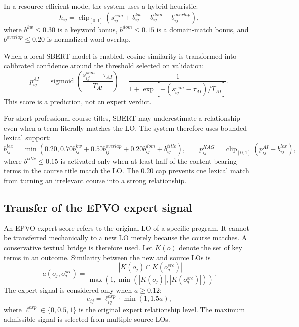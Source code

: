 \documentclass[twoside,11pt]{article}
\newcommand{\clip}{\operatorname{clip}}
\newcommand{\sigmoid}{\operatorname{sigmoid}}
\begin{document}
In a resource-efficient mode, the system uses a hybrid heuristic:
\begin{equation}
  h_{ij}=\clip_{[0,1]}
  \left(
    s_{ij}^{sem}
    +b_{ij}^{kw}
    +b_{ij}^{dom}
    +b_{ij}^{overlap}
  \right),
  \label{eq:heuristic}
\end{equation}
where $b^{kw}\le0.30$ is a keyword bonus, $b^{dom}\le0.15$ is a domain-match bonus, and $b^{overlap}\le0.20$ is normalized word overlap.

When a local SBERT model is enabled, cosine similarity is transformed into calibrated confidence around the threshold selected on validation:
\begin{equation}
  p_{ij}^{AI}=
  \sigmoid\left(
    \frac{s_{ij}^{sem}-\tau_{AI}}{T_{AI}}
  \right)
  =
  \frac{1}
       {1+\exp\left[-(s_{ij}^{sem}-\tau_{AI})/T_{AI}\right]}.
  \label{eq:calibration}
\end{equation}
This score is a prediction, not an expert verdict.

For short professional course titles, SBERT may underestimate a relationship even when a term literally matches the LO. The system therefore uses bounded lexical support:
\begin{equation}
  b_{ij}^{lex}=\min\!\left(0.20,
  0.70b_{ij}^{kw}+0.50b_{ij}^{overlap}+0.20b_{ij}^{dom}+b_{ij}^{title}\right),
  \qquad
  p_{ij}^{KAG}=\clip_{[0,1]}\left(p_{ij}^{AI}+b_{ij}^{lex}\right),
  \label{eq:ai-lexical-support}
\end{equation}
where $b^{title}\le0.15$ is activated only when at least half of the content-bearing terms in the course title match the LO. The 0.20 cap prevents one lexical match from turning an irrelevant course into a strong relationship.

\subsection{Transfer of the EPVO expert signal}

An EPVO expert score refers to the original LO of a specific program. It cannot be transferred mechanically to a new LO merely because the course matches. A conservative textual bridge is therefore used. Let $K(o)$ denote the set of key terms in an outcome. Similarity between the new and source LOs is
\begin{equation}
  a(o_j,o_q^{src})=
  \frac{|K(o_j)\cap K(o_q^{src})|}
       {\max\left(1,\min(|K(o_j)|,|K(o_q^{src})|)\right)}.
  \label{eq:expert-overlap}
\end{equation}
The expert signal is considered only when $a\ge0.12$:
\begin{equation}
  e_{ij}=
  \ell_{iq}^{exp}\cdot
  \min(1,1.5a),
  \label{eq:expert-transfer}
\end{equation}
where $\ell^{exp}\in\{0,0.5,1\}$ is the original expert relationship level. The maximum admissible signal is selected from multiple source LOs.
\end{document}
